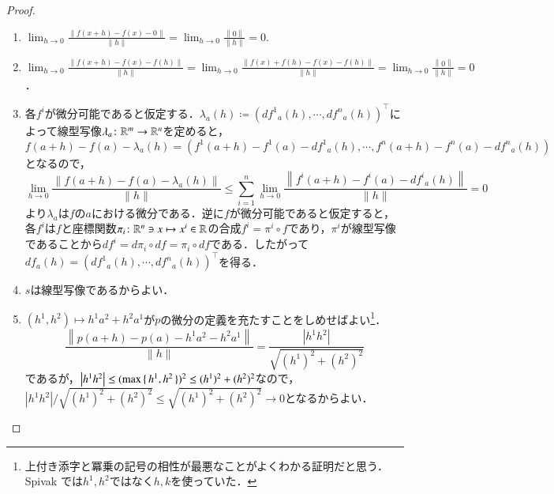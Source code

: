 \begin{proof}
\leavevmode
\begin{enumerate}
\item $\displaystyle \lim_{h \to 0} \frac{\left\| f(x+h) - f(x) - 0 \right\|}{\|h\|} = \lim_{h \to 0} \frac{\left\| 0 \right\|}{\|h\|} = 0.$
\item $\displaystyle \lim_{h \to 0} \frac{\left\| f(x+h) - f(x) - f(h) \right\|}{\|h\|} = \lim_{h \to 0} \frac{\left\| f(x) + f(h) - f(x) - f(h) \right\|}{\|h\|} = \lim_{h \to 0} \frac{\left\| 0 \right\|}{\|h\|} = 0$．
\item 各$f^i$が微分可能であると仮定する．$\lambda_a(h) \coloneqq (d{f^1}_a(h), \cdots, d{f^n}_a(h))^\top$によって線型写像$\lambda_a \colon \mathbb{R}^m \to \mathbb{R}^n$を定めると，
\begin{equation}
f(a+h) - f(a) - \lambda_a(h) = (f^1(a+h) - f^1(a) - d{f^1}_a(h), \cdots, f^n(a+h) - f^n(a) - d{f^n}_a(h))
\end{equation}となるので，
\begin{equation}
\lim_{h \to 0} \frac{\left\|f(a+h) - f(a) - \lambda_a(h)\right\|}{\|h\|} \leq \sum_{i=1}^n \lim_{h\to 0} \frac{\left\| f^i(a+h) - f^i(a) - d{f^i}_a(h) \right\|}{\|h\|} = 0
\end{equation}より$\lambda_a$は$f$の$a$における微分である．逆に$f$が微分可能であると仮定すると，各$f^i$は$f$と座標関数$\pi_i \colon \mathbb{R}^n \ni x \mapsto x^i \in \mathbb{R}$の合成$f^i = \pi^i \circ f$であり，$\pi^i$が線型写像であることから$df^i = d\pi_i \circ df = \pi_i \circ df$である．したがって$df_a(h) = (d{f^1}_a(h), \cdots, d{f^n}_a(h))^\top$を得る．
\item $s$は線型写像であるからよい．
\item $(h^1,h^2) \mapsto h^1a^2+h^2a^1$が$p$の微分の定義を充たすことをしめせばよい\footnote{上付き添字と冪乗の記号の相性が最悪なことがよくわかる証明だと思う．Spivak では$h^1, h^2$ではなく$h,k$を使っていた．}．
\begin{equation}
\frac{\left\|p(a+h) - p(a) - h^1a^2-h^2a^1\right\|}{\|h\|} = \frac{\left|h^1h^2\right|}{\sqrt{(h^1)^2 + (h^2)^2 }}
\end{equation}であるが，$\left|h^1h^2\right| \leq (\max\set{h^1, h^2})^2 \leq (h^1)^2 + (h^2)^2$なので，$\left|h^1h^2\right| / \sqrt{(h^1)^2 + (h^2)^2 } \leq \sqrt{(h^1)^2 + (h^2)^2 } \to 0$となるからよい．
\end{enumerate}
\end{proof}

